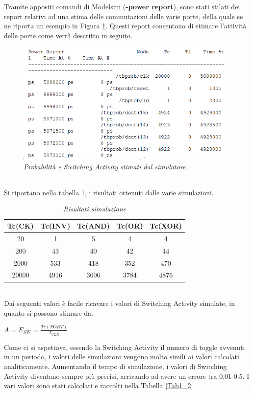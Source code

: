 Tramite appositi comandi di Modelsim (\textbf{-power report}), sono stati stilati dei report relativi ad una stima delle commutazioni delle varie porte, della quale se ne riporta un esempio in Figura \ref{fig1_2}. Questi report consentono di stimare l'attività delle porte come verrà descritto in seguito.\\
\begin{figure}[!htb]
	\centering
	\includegraphics[scale=1]{immagini/fig1_2}
	\caption{\textit{Probabilità e Switching Activity stimati dal simulatore}}
	\label{fig1_2}
\end{figure} \\
Si riportano nella tabella \ref{tab1}, i risultati ottenuti dalle varie simulazioni.
\begin{table}[!h]\footnotesize
	\centering
	\begin{tabular}{|c|c|c|c|c|}
		\hline
		\textbf{Tc(CK)} & \textbf{Tc(INV)}& \textbf{Tc(AND)}& \textbf{Tc(OR)} &\textbf{Tc(XOR)}\\
		\hline
		20 & 1  & 5& 4&4\\
		\hline
		200 &  43 &40&42& 44\\
		\hline
		2000& 533& 418&352&470\\
		\hline
		20000& 4916& 3606&3784&4876\\
		\hline
	\end{tabular}
	\caption{\textit{Risultati simulazione}}
	\label{tab1}
\end{table}\\
Dai seguenti valori è facile ricavare i valori di Switching Activity simulate, in quanto si possono stimare da:
\begin{center}
	$ A=E_{SW}=\frac{Tc(PORT)}{T_{CLK}} $
\end{center}
Come ci si aspettava, essendo la Switching Activity il numero di toggle avvenuti in un periodo, i valori delle simulazioni vengono molto simili ai valori calcolati analiticamente. Aumentando il tempo di simulazione, i valori di Switching Activity diventano sempre più precisi, arrivando ad avere un errore tra 0.01-0.5. I vari valori sono stati calcolati e raccolti nella Tabella \ref{Tab1_2}
